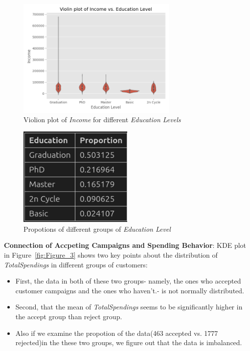 \documentclass[a4paper,12pt]{article}
\begin{document}
\begin{figure}[H]
    \centering
    \includegraphics[width=0.7\textwidth]{./images/violin_income_vs_edu_level.png}
    \caption{Violion plot of \textit{Income} for different \textit{Education Levels}}
    \label{fig:Figure_1}
\end{figure}

\begin{figure}[H]
    \centering
    \includegraphics[width=0.5\textwidth]{./images/propotion_table_for_different_edu_levels.png}
    \caption{Propotions of different groups of \textit{Education Level} }
    \label{fig:Figure_2}
\end{figure}


\noindent \textbf{Connection of Accpeting Campaigns and Spending Behavior}: KDE plot in Figure~\ref{fig:Figure_3} shows two key points about the distribution of \textit{TotalSpendings} in different groups of customers:
\begin{itemize}
    \item First, the data in both of these two groups- namely, the ones who accepted customer campaigns and the ones who haven't.- is not normally distributed.
    \item Second, that the mean of \textit{TotalSpendings} seems to be significantly higher in the accept group than reject group.
    \item Also if we examine the propotion of the data(463 accepted vs. 1777 rejected)in the these two groups, we figure out that the data is imbalanced.
\end{itemize}
\end{document}
